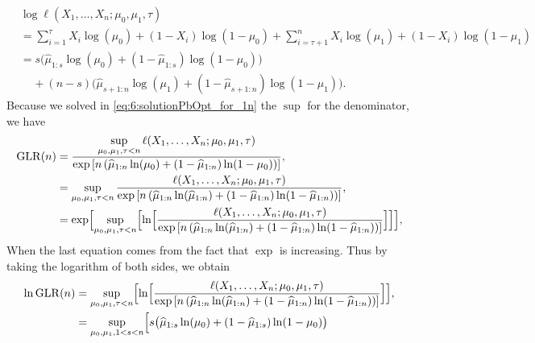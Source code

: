 \begin{smallproof}
    \begin{align*}
        & \log\ell(X_1, \ldots, X_n ; \mu_0,\mu_1,\tau) \\
        &= \sum_{i=1}^{\tau} X_i \log(\mu_0) + (1-X_i) \log(1-\mu_0) + \sum_{i=\tau+1}^n X_i \log(\mu_1) + (1-X_i) \log(1-\mu_1) \\
        &= s \bigl( \widehat{\mu}_{1:s} \log(\mu_0) + (1 - \widehat{\mu}_{1:s}) \log(1-\mu_0) \bigr) \\
        & \;\;\;\; + (n-s) \bigl( \widehat{\mu}_{s+1:n} \log(\mu_1) + (1 - \widehat{\mu}_{s+1:n}) \log(1-\mu_1) \bigr).
    \end{align*}
    Because we solved in \eqref{eq:6:solutionPbOpt_for_1n} the $\sup$ for the denominator,
    we have
    \begin{align*}
        \mathrm{GLR}(n)
        &= \frac{\sup\limits_{\mu_0,\mu_1,\tau < n}\ell(X_1, \ldots, X_n ; \mu_0,\mu_1,\tau)}{ \exp\left[ n \left( \widehat{\mu}_{1:n} \ln(\mu_0) + (1 - \widehat{\mu}_{1:n}) \ln(1-\mu_0) \right) \right] }, \\
        &= \sup\limits_{\mu_0,\mu_1,\tau < n} \frac{\ell(X_1, \ldots, X_n ; \mu_0,\mu_1,\tau)}{ \exp\left[ n \left( \widehat{\mu}_{1:n} \ln(\widehat{\mu}_{1:n}) + (1 - \widehat{\mu}_{1:n}) \ln(1-\widehat{\mu}_{1:n}) \right) \right] }, \\
        &= \exp \Bigl[ \sup\limits_{\mu_0,\mu_1,\tau < n} \Bigl[ \ln\Bigl[ \frac{\ell(X_1, \ldots, X_n ; \mu_0,\mu_1,\tau)}{ \exp\left[ n \left( \widehat{\mu}_{1:n} \ln(\widehat{\mu}_{1:n}) + (1 - \widehat{\mu}_{1:n}) \ln(1-\widehat{\mu}_{1:n}) \right) \right] } \Bigr] \Bigr] \Bigr],
    \end{align*}
    When the last equation comes from the fact that $\exp$ is increasing.
    Thus by taking the logarithm of both sides, we obtain
    \begin{align*}
        \log \GLR(n)
        &= \sup\limits_{\mu_0,\mu_1,\tau < n} \Bigl[ \log\Bigl[ \frac{\ell(X_1, \ldots, X_n ; \mu_0,\mu_1,\tau)}{ \exp\left[ n \left( \widehat{\mu}_{1:n} \log(\widehat{\mu}_{1:n}) + (1 - \widehat{\mu}_{1:n}) \log(1-\widehat{\mu}_{1:n}) \right) \right] } \Bigr] \Bigr],  \\
        &= \sup\limits_{\mu_0,\mu_1, 1 < s < n} \Bigl[
            s \bigl( \widehat{\mu}_{1:s} \log(\mu_0) + (1 - \widehat{\mu}_{1:s}) \log(1-\mu_0) \bigr) \\

\end{align*}
\end{smallproof}

